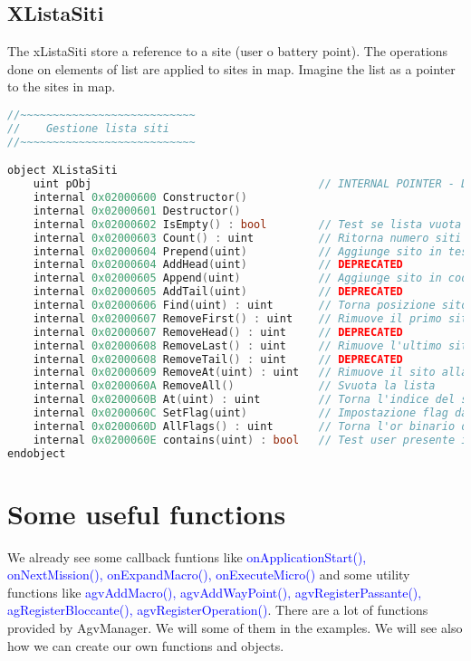 \subsection{XListaSiti}
The xListaSiti store a reference to a site (user o battery point). The operations done on elements of list are applied to sites in map. Imagine the list as a pointer to the sites in map.

\begin{lstlisting}[language=c++,caption= XListaSiti, label= lstXListaSiti]
//~~~~~~~~~~~~~~~~~~~~~~~~~~~
//    Gestione lista siti    
//~~~~~~~~~~~~~~~~~~~~~~~~~~~

object XListaSiti
	uint pObj									// INTERNAL POINTER - DO NOT TOUCH
	internal 0x02000600 Constructor()
	internal 0x02000601 Destructor()
	internal 0x02000602 IsEmpty() : bool		// Test se lista vuota
	internal 0x02000603 Count() : uint			// Ritorna numero siti in lista
	internal 0x02000604 Prepend(uint)			// Aggiunge sito in testa alla lista
	internal 0x02000604 AddHead(uint)			// DEPRECATED
	internal 0x02000605 Append(uint)			// Aggiunge sito in coda alla lista
	internal 0x02000605 AddTail(uint)			// DEPRECATED
	internal 0x02000606 Find(uint) : uint		// Torna posizione sito in lista (-1 se non trovato)
	internal 0x02000607 RemoveFirst() : uint	// Rimuove il primo sito dalla lista, e ne torna il valore
	internal 0x02000607 RemoveHead() : uint		// DEPRECATED
	internal 0x02000608 RemoveLast() : uint		// Rimuove l'ultimo sito dalla lista, e ne torna il valore
	internal 0x02000608 RemoveTail() : uint		// DEPRECATED
	internal 0x02000609 RemoveAt(uint) : uint	// Rimuove il sito alla posizione specificata (ritorna l'indice del sito rimosso)
	internal 0x0200060A RemoveAll()				// Svuota la lista
	internal 0x0200060B At(uint) : uint			// Torna l'indice del sito alla posizione specificata
	internal 0x0200060C SetFlag(uint)			// Impostazione flag da settare per tutti i siti in lista
	internal 0x0200060D AllFlags() : uint		// Torna l'or binario dei flags di tutti i siti in lista
	internal 0x0200060E contains(uint) : bool	// Test user presente in lista
endobject
\end{lstlisting}
	
%
\section{Some useful functions}
We already see some callback funtions like \textcolor{blue}{onApplicationStart(), onNextMission(), onExpandMacro(), onExecuteMicro()} and some utility functions like \textcolor{blue}{agvAddMacro(), agvAddWayPoint(), agvRegisterPassante(), agRegisterBloccante(), agvRegisterOperation()}. There are a lot of functions provided by AgvManager. We will some of them in the examples. We will see also how we can create our own functions and objects.

